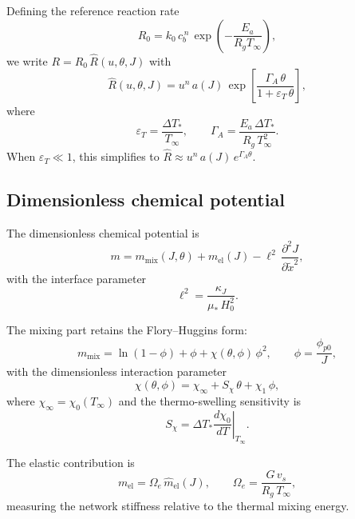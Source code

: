 \documentclass[aps,pre,reprint,superscriptaddress,longbibliography,floatfix]{revtex4-2}
\newcommand{\Rhat}{\widehat{R}}
\newcommand{\pp}{\phi_{p0}}
\begin{document}
Defining the reference reaction rate
\begin{equation}
  R_0 = k_0\,c_b^{\,n}\,\exp\!\left(-\frac{E_a}{R_g T_\infty}\right),
\end{equation}
we write $R = R_0\,\Rhat(u,\theta,J)$ with
\begin{equation}
  \Rhat(u,\theta,J)
  = u^n\,a(J)\,
  \exp\!\left[\frac{\Gamma_A\,\theta}{1+\varepsilon_T\,\theta}\right],
  \label{eq:Rhat}
\end{equation}
where
\begin{equation}
  \varepsilon_T = \frac{\Delta T_*}{T_\infty},
  \qquad
  \Gamma_A = \frac{E_a\,\Delta T_*}{R_g\,T_\infty^2}.
  \label{eq:epsT_GammaA}
\end{equation}
When $\varepsilon_T \ll 1$, this simplifies to $\Rhat \approx u^n\,a(J)\,e^{\Gamma_A\theta}$.

\subsection{Dimensionless chemical potential}

The dimensionless chemical potential is
\begin{equation}
  m = m_\mathrm{mix}(J,\theta) + m_\mathrm{el}(J) - \ell^2\,\frac{\partial^2 J}{\partial \tilde{x}^2},
  \label{eq:m_nondim}
\end{equation}
with the interface parameter
\begin{equation}
  \ell^2 = \frac{\kappa_J}{\mu_*\,H_0^2}.
\end{equation}

The mixing part retains the Flory--Huggins form:
\begin{equation}
  m_\mathrm{mix} = \ln(1-\phi) + \phi + \chi(\theta,\phi)\,\phi^2,
  \qquad \phi = \frac{\pp}{J},
  \label{eq:m_mix}
\end{equation}
with the dimensionless interaction parameter
\begin{equation}
  \chi(\theta,\phi) = \chi_\infty + S_\chi\,\theta + \chi_1\,\phi,
  \label{eq:chi_nondim}
\end{equation}
where $\chi_\infty = \chi_0(T_\infty)$ and the thermo-swelling sensitivity is
\begin{equation}
  S_\chi = \Delta T_*\left.\frac{d\chi_0}{dT}\right|_{T_\infty}.
  \label{eq:Schi}
\end{equation}

The elastic contribution is
\begin{equation}
  m_\mathrm{el} = \Omega_e\,\widehat{m}_\mathrm{el}(J),
  \qquad
  \Omega_e = \frac{G\,v_s}{R_g\,T_\infty},
\end{equation}
measuring the network stiffness relative to the thermal mixing energy.
\end{document}
